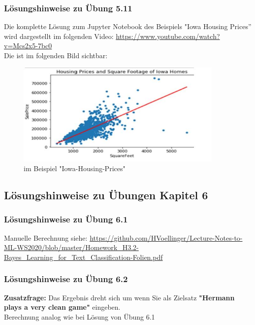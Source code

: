 \documentclass[12pt]{article}
\begin{document}
\subsubsection{Lösungshinweise zu Übung 5.11}
%
Die komplette Lösung zum Jupyter Notebook des Beispiels "Iowa Housing Prices” wird dargestellt im folgenden Video: \url{https://www.youtube.com/watch?v=Mcs2x5-7bc0}\\ 
Die {\color{red}{sLR-Gerade}} ist im folgenden Bild sichtbar: 
\begin{figure}[ht]
  \centering
  \hspace*{-0.1cm} 
  \includegraphics[width=0.9\textwidth]{Iowa-Housing-Prices}
  \caption{{\color{red}{sLR-Gerade}} im Beispiel "Iowa-Housing-Prices"}     
  \label{fig:Iowa-HP}
\end{figure}

\newpage

\subsection{Lösungshinweise zu Übungen Kapitel 6}

\subsubsection{Lösungshinweise zu Übung 6.1}

Manuelle Berechnung siehe: \url{https://github.com/HVoellinger/Lecture-Notes-to-ML-WS2020/blob/master/Homework_H3.2-Bayes_Learning_for_Text_Classification-Folien.pdf}\\

\subsubsection{Lösungshinweise zu Übung 6.2}

\textbf{Zusatzfrage:} Das Ergebnis dreht sich um wenn Sie als Zielsatz \textbf{"Hermann plays a very clean game"} eingeben.\\
Berechnung analog wie bei Lösung von Übung 6.1\\
\end{document}
